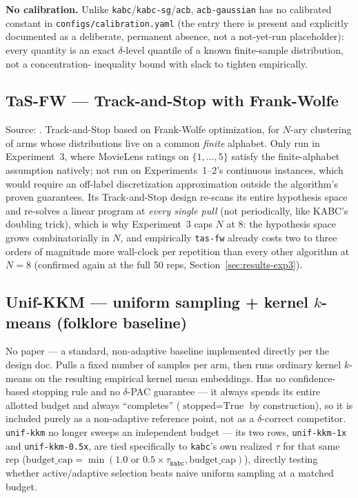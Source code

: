 \documentclass[11pt]{article}
\begin{document}
\textbf{No calibration.} Unlike \texttt{kabc}/\texttt{kabc-sg}/\texttt{acb},
\texttt{acb-gaussian} has no calibrated constant in
\texttt{configs/calibration.yaml} (the entry there is present and
explicitly documented as a deliberate, permanent absence, not a
not-yet-run placeholder): every quantity is an exact $\delta$-level
quantile of a known finite-sample distribution, not a concentration-
inequality bound with slack to tighten empirically.

\subsection{TaS-FW --- Track-and-Stop with Frank-Wolfe}

Source: \cite{tasfw2024}. Track-and-Stop based on Frank-Wolfe optimization, for
$N$-ary clustering of arms whose distributions live on a common \emph{finite}
alphabet. Only run in Experiment~3, where MovieLens ratings on
$\{1,\ldots,5\}$ satisfy the finite-alphabet assumption natively; not run on
Experiments~1--2's continuous instances, which would require an off-label
discretization approximation outside the algorithm's proven guarantees. Its
Track-and-Stop design re-scans its entire hypothesis space and re-solves a
linear program at \emph{every single pull} (not periodically, like KABC's
doubling trick), which is why Experiment~3 caps $N$ at 8: the hypothesis
space grows combinatorially in $N$, and empirically \texttt{tas-fw} already
costs two to three orders of magnitude more wall-clock per repetition than
every other algorithm at $N=8$ (confirmed again at the full 50 reps,
Section~\ref{sec:results-exp3}).

\subsection{Unif-KKM --- uniform sampling + kernel $k$-means (folklore baseline)}

No paper --- a standard, non-adaptive baseline implemented directly per the
design doc. Pulls a fixed number of samples per arm, then runs ordinary
kernel $k$-means on the resulting empirical kernel mean embeddings. Has no
confidence-based stopping rule and no $\delta$-PAC guarantee --- it always
spends its entire allotted budget and always ``completes''
($\text{stopped}=\text{True}$ by construction), so it is included purely as
a non-adaptive reference point, not as a $\delta$-correct competitor.
\texttt{unif-kkm} no longer sweeps an independent budget --- its two rows,
\texttt{unif-kkm-1x} and \texttt{unif-kkm-0.5x}, are tied specifically to
\texttt{kabc}'s own realized $\tau$ for that same rep
($\text{budget\_cap} = \min(1.0\text{ or }0.5 \times \tau_{\texttt{kabc}},
\text{budget\_cap})$), directly testing whether active/adaptive selection
beats naive uniform sampling at a matched budget.
\end{document}
